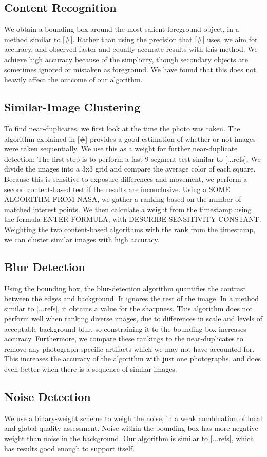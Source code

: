 \documentclass[twocolumn]{article}
\begin{document}
\subsection{Content Recognition}
We obtain a bounding box around the most salient foreground object, in a method similar to [\#]. Rather than using the precision that [\#] uses, we aim for accuracy, and observed faster and equally accurate results with this method. We achieve high accuracy because of the simplicity, though secondary objects are sometimes ignored or mistaken as foreground. We have found that this does not heavily affect the outcome of our algorithm.
\subsection{Similar-Image Clustering}
To find near-duplicates, we first look at the time the photo was taken. The algorithm explained in [\#] provides a good estimation of whether or not images were taken sequentially. We use this as a weight for further near-duplicate detection:
The first step is to perform a fast 9-segment test similar to [...refs]. We divide the images into a 3x3 grid and compare the average color of each square. Because this is sensitive to exposure differences and movement, we perform a second content-based test if the results are inconclusive. Using a SOME ALGORITHM FROM NASA, we gather a ranking based on the number of matched interest points.
We then calculate a weight from the timestamp using the formula ENTER FORMULA, with DESCRIBE SENSITIVITY CONSTANT.
Weighting the two content-based algorithms with the rank from the timestamp, we can cluster similar images with high accuracy.
\subsection{Blur Detection}
Using the bounding box, the blur-detection algorithm quantifies the contrast between the edges and background. It ignores the rest of the image. In a method similar to [...refs], it obtains a value for the sharpness. This algorithm does not perform well when ranking diverse images, due to differences in scale and levels of acceptable background blur, so constraining it to the bounding box increases accuracy. Furthermore, we compare these rankings to the near-duplicates to remove any photograph-specific artifacts which we may not have accounted for. This increases the accuracy of the algorithm with just one photographs, and does even better when there is a sequence of similar images.
\subsection{Noise Detection}
We use a binary-weight scheme to weigh the noise, in a weak combination of local and global quality assessment. Noise within the bounding box has more negative weight than noise in the background. Our algorithm is similar to [...refs], which has results good enough to support itself.
\end{document}
